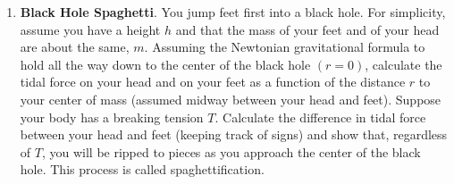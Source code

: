 \documentclass[fleqn]{article}
\begin{document}
\begin{enumerate}
    \pagebreak

    \item \textbf{Black Hole Spaghetti}. You jump feet first into a black hole. For simplicity, assume you have
    a height $h$ and that the mass of your feet and of your head are about the same, $m$. Assuming the Newtonian gravitational formula to hold
    all the way down to the center of the black hole $(r = 0)$, calculate the tidal force on your head and on your feet as a function of the distance $r$
    to your center of mass (assumed midway between your head and feet). Suppose your body has a breaking tension $T$. Calculate the difference
    in tidal force between your head and feet (keeping track of signs) and show that, regardless of $T$, you will be ripped to pieces as you approach
    the center of the black hole. This process is called spaghettification.


\end{enumerate}
\end{document}
